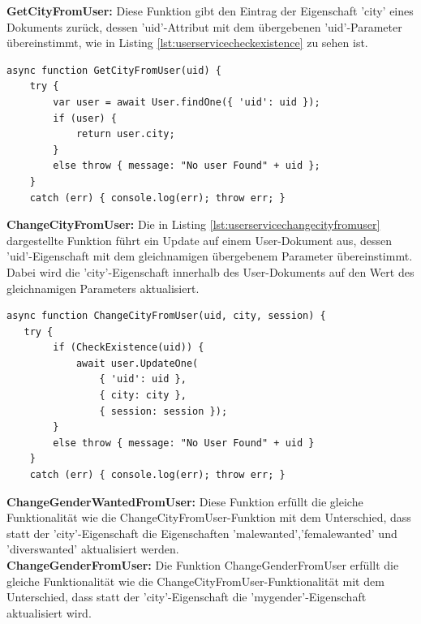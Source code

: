 \noindent
\textbf{GetCityFromUser:}
Diese Funktion gibt den Eintrag der Eigenschaft 'city' eines Dokuments zurück, dessen 'uid'-Attribut mit dem übergebenen 'uid'-Parameter übereinstimmt, wie in Listing \ref{lst:userservicecheckexistence} zu sehen ist.\\

\begin{lstlisting}[caption=User Service - CheckExistence, label=lst:userservicecheckexistence]
async function GetCityFromUser(uid) {
    try {
        var user = await User.findOne({ 'uid': uid });
        if (user) {
            return user.city;
        }
        else throw { message: "No user Found" + uid };
    }
    catch (err) { console.log(err); throw err; }
\end{lstlisting}

\noindent
\textbf{ChangeCityFromUser:}
Die in Listing \ref{lst:userservicechangecityfromuser} dargestellte Funktion führt ein Update auf einem User-Dokument aus, dessen 'uid'-Eigenschaft mit dem gleichnamigen übergebenem Parameter übereinstimmt. Dabei wird die 'city'-Eigenschaft innerhalb des User-Dokuments auf den Wert des gleichnamigen Parameters aktualisiert.\\

\begin{lstlisting}[caption=User Service - ChangeCityFromUser, label=lst:userservicechangecityfromuser]
async function ChangeCityFromUser(uid, city, session) {  
   try {
        if (CheckExistence(uid)) {
            await user.UpdateOne(
                { 'uid': uid },
                { city: city },
                { session: session });
        }
        else throw { message: "No User Found" + uid }
    }
    catch (err) { console.log(err); throw err; }
\end{lstlisting}

\noindent
\textbf{ChangeGenderWantedFromUser:}
Diese Funktion erfüllt die gleiche Funktionalität wie die ChangeCityFromUser-Funktion  mit dem Unterschied, dass statt der 'city'-Eigenschaft die Eigenschaften 'malewanted','femalewanted' und 'diverswanted' aktualisiert werden.\\

\noindent
\textbf{ChangeGenderFromUser:}
Die Funktion ChangeGenderFromUser erfüllt die gleiche Funktionalität wie die ChangeCityFromUser-Funktionalität mit dem Unterschied, dass statt der 'city'-Eigenschaft die 'mygender'-Eigenschaft aktualisiert wird.\\


%
%


